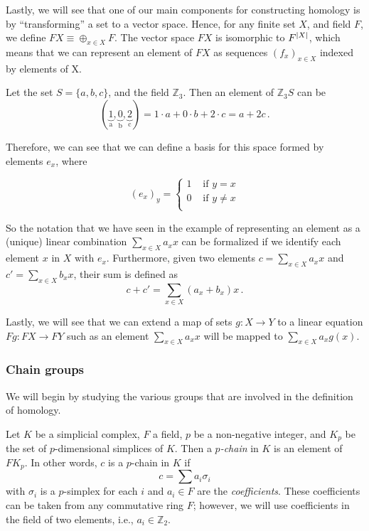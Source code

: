 \documentclass[../main.tex]{subfiles}
\begin{document}
Lastly, we will see that one of our main components for constructing homology is by ``transforming'' a set to a vector space. Hence, for any finite set $X$, and field $F$, we define $FX \equiv \oplus_{x \in X} F$. The vector space $FX$ is isomorphic to $F^{\left\lvert X \right\rvert}$, which means that we can represent an element of $FX$ as sequences $(f_x)_{x \in X}$ indexed by elements of X.

\begin{exmp}
Let the set $S=\{a, b, c\}$, and the field $\mathbb{Z}_3$. Then an element of $\mathbb{Z}_3S$ can be
\[
( \underbrace{1}_\text{a}, \underbrace{0}_\text{b}, \underbrace{2}_\text{c}) = 1 \cdot a + 0 \cdot b + 2 \cdot c = a + 2c\,.
\]
\end{exmp}

Therefore, we can see that we can define a basis for this space formed by elements $e_x$, where

\[
(e_x)_y = \left\{\begin{matrix}
1 & \text{ if } y=x\\
0 & \text{ if } y \neq x\\
\end{matrix}\right.
\]

So the notation that we have seen in the example of representing an element as a (unique) linear combination $\sum_{x \in X} a_x x$ can be formalized if we identify each element $x$ in $X$ with $e_x$. Furthermore, given two elements $c = \sum_{x \in X} a_x x$ and $c' = \sum_{x \in X} b_x x$, their sum is defined as
\[
c + c' = \sum_{x \in X} (a_x + b_x) x\,.
\]

Lastly, we will see that we can extend a map of sets $g:X \to Y$ to a linear equation $Fg: FX \to FY$ such as an element $\sum_{x \in X} a_x x$ will be mapped to $\sum_{x \in X} a_x g(x)$.


\subsubsection*{Chain groups}
We will begin by studying the various groups that are involved in the definition of homology.


Let $K$ be a simplicial complex, $F$ a field, $p$ be a non-negative integer, and $K_p$ be the set of $p$-dimensional simplices of $K$. Then a \emph{$p$-chain} in $K$ is an element of $FK_p$. In other words, $c$ is a $p$-chain in $K$ if
\[
c = \sum a_i\sigma_i
\]
with $\sigma_i$ is a $p$-simplex for each $i$ and $a_i \in F$ are the \emph{coefficients}. These coefficients can be taken from any commutative ring $F$; however, we will use coefficients in the field of two elements, i.e.,  $a_i \in \mathbb{Z}_2$.
\end{document}
